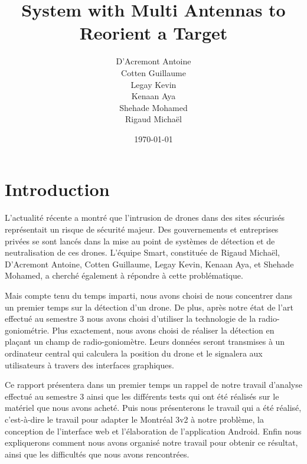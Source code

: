 \documentclass[a4paper, 11pt, oneside, oldfontcommands]{memoir}
\title{System with Multi Antennas to Reorient a Target}
\author{D'Acremont Antoine\\Cotten Guillaume\\Legay Kevin\\Kenaan Aya\\Shehade Mohamed\\Rigaud Michaël}
\date{\today}
\newcounter{rem}[chapter]
\newcounter{th}[chapter]
\newcommand{\cad}{c'est-à-dire }
\begin{document}
\maketitle
\thispagestyle{empty}
\newpage

\tableofcontents





\chapter*{Introduction}

L’actualité récente a montré que l’intrusion de drones dans des sites sécurisés représentait un risque de sécurité majeur. Des gouvernements et entreprises privées se sont lancés dans la mise au point de systèmes de détection et de neutralisation de ces drones. L'équipe Smart, constituée de Rigaud Michaël, D'Acremont Antoine, Cotten Guillaume, Legay Kevin, Kenaan Aya, et Shehade Mohamed, a cherché également à répondre à cette problématique.

Mais compte tenu du temps imparti, nous avons choisi de nous concentrer dans un premier temps sur la détection d'un drone. De plus, après notre état de l'art effectué au semestre 3 nous avons choisi d'utiliser la technologie de la radio-goniométrie.  Plus exactement, nous avons choisi de réaliser la détection en plaçant un champ de radio-goniomètre. Leurs données seront transmises à un ordinateur central qui calculera la position du drone et le signalera aux utilisateurs à travers des interfaces graphiques.

Ce rapport présentera dans un premier temps un rappel de notre travail d'analyse effectué au semestre 3 ainsi que les différents tests qui ont été réalisés sur le matériel que nous avons acheté. Puis nous présenterons le travail qui a été réalisé, \cad le travail pour adapter le Montréal 3v2 à notre problème, la conception de l'interface web et l'élaboration de l'application Android. Enfin nous expliquerons comment nous avons organisé notre travail pour obtenir ce résultat, ainsi que les difficultés que nous avons rencontrées.



\newpage	  

\end{document}
